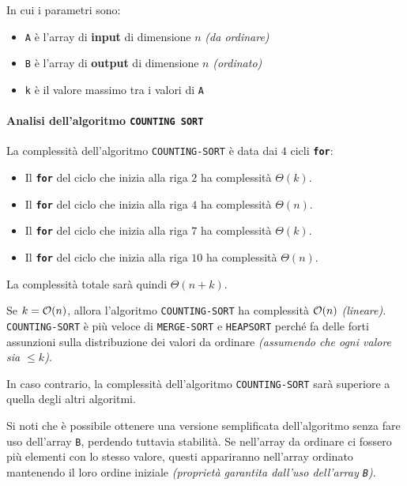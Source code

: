 \documentclass[italian, 10pt]{article}
\begin{document}
In cui i parametri sono:

\begin{itemize}
  \item \texttt{A} è l'array di \textbf{input} di dimensione \(n\) \textit{(da ordinare)}
  \item \texttt{B} è l'array di \textbf{output} di dimensione \(n\) \textit{(ordinato)}
  \item \texttt{k} è il valore massimo tra i valori di \texttt{A}
\end{itemize}

\paragraph{Analisi dell'algoritmo \texttt{COUNTING SORT}}

La complessità dell'algoritmo \texttt{COUNTING-SORT} è data dai \(4\) cicli \textbf{\texttt{for}}:

\begin{itemize}
  \item Il \textbf{\texttt{for}} del ciclo che inizia alla riga \(2\) ha complessità \(\Theta(k)\).
  \item Il \textbf{\texttt{for}} del ciclo che inizia alla riga \(4\) ha complessità \(\Theta(n)\).
  \item Il \textbf{\texttt{for}} del ciclo che inizia alla riga \(7\) ha complessità \(\Theta(k)\).
  \item Il \textbf{\texttt{for}} del ciclo che inizia alla riga \(10\) ha complessità \(\Theta(n)\).
\end{itemize}

La complessità totale sarà quindi \(\Theta(n+k)\).

Se \(k = \mathcal{O}(n)\), allora l'algoritmo \texttt{COUNTING-SORT} ha complessità \(\mathcal{O}(n)\) \textit{(lineare)}.
\texttt{COUNTING-SORT} è più veloce di \texttt{MERGE-SORT} e \texttt{HEAPSORT} perché fa delle forti assunzioni sulla distribuzione dei valori da ordinare \textit{(assumendo che ogni valore sia \(\leq k\))}.

In caso contrario, la complessità dell'algoritmo \texttt{COUNTING-SORT} sarà superiore a quella degli altri algoritmi.

\bigskip
Si noti che è possibile ottenere una versione semplificata dell'algoritmo senza fare uso dell'array \texttt{B}, perdendo tuttavia stabilità.
Se nell'array da ordinare ci fossero più elementi con lo stesso valore, questi appariranno nell'array ordinato mantenendo il loro ordine iniziale \textit{(proprietà garantita dall'uso dell'array \texttt{B})}.
\end{document}
